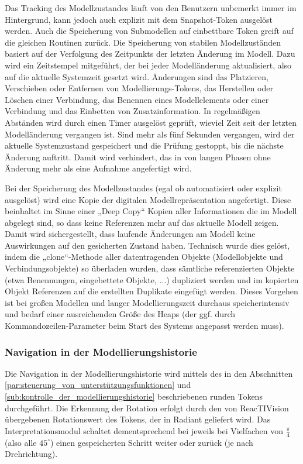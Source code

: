Das Tracking des Modellzustandes läuft von den Benutzern unbemerkt immer im Hintergrund, kann jedoch auch explizit mit dem Snapshot-Token ausgelöst werden. Auch die Speicherung von Submodellen auf einbettbare Token greift auf die gleichen Routinen zurück. Die Speicherung von stabilen Modellzuständen basiert auf der Verfolgung des Zeitpunkts der letzten Änderung im Modell. Dazu wird ein Zeitstempel mitgeführt, der bei jeder Modelländerung aktualisiert, also auf die aktuelle Systemzeit gesetzt wird. Änderungen sind das Platzieren, Verschieben oder Entfernen von Modellierungs-Tokens, das Herstellen oder Löschen einer Verbindung, das Benennen eines Modellelements oder einer Verbindung und das Einbetten von Zusatzinformation. In regelmäßigen Abständen wird durch einen Timer ausgelöst geprüft, wieviel Zeit seit der letzten Modelländerung vergangen ist. Sind mehr als fünf Sekunden vergangen, wird der aktuelle Systemzustand gespeichert und die Prüfung gestoppt, bis die nächste Änderung auftritt. Damit wird verhindert, das in von langen Phasen ohne Änderung mehr als eine Aufnahme angefertigt wird.

Bei der Speicherung des Modellzustandes (egal ob automatisiert oder explizit ausgelöst) wird eine Kopie der digitalen Modellrepräsentation angefertigt. Diese beinhaltet im Sinne einer „Deep Copy“ Kopien aller Informationen die im Modell abgelegt sind, so dass keine Referenzen mehr auf das aktuelle Modell zeigen. Damit wird sichergestellt, dass laufende Änderungen am Modell keine Auswirkungen auf den gesicherten Zustand haben. Technisch wurde dies gelöst, indem die „clone“-Methode aller datentragenden Objekte (Modellobjekte und Verbindungsobjekte) so überladen wurden, dass sämtliche referenzierten Objekte (etwa Benennungen, eingebettete Objekte, ...) dupliziert werden und im kopierten Objekt Referenzen auf die erstellten Duplikate eingefügt werden. Dieses Vorgehen ist bei großen Modellen und langer Modellierungszeit durchaus speicherintensiv und bedarf einer ausreichenden Größe des Heaps (der ggf. durch Kommandozeilen-Parameter beim Start des Systems angepasst werden muss).

\subsubsection{Navigation in der Modellierungshistorie} %
\label{ssub:navigation_durch_die_modellierungshistorie}

Die Navigation in der Modellierungshistorie wird mittels des in den Abschnitten \ref{par:steuerung_von_unterstützungsfunktionen} und \ref{sub:kontrolle_der_modellierungshistorie} beschriebenen runden Tokens durchgeführt. Die Erkennung der Rotation erfolgt durch den von ReacTIVision übergebenen Rotationswert des Tokens, der in Radiant geliefert wird. Das Interpretationsmodul schaltet dementsprechend bei jeweils bei Vielfachen von $\frac{\pi}{4}$ (also alle $45^\circ$) einen gespeicherten Schritt weiter oder zurück (je nach Drehrichtung).

